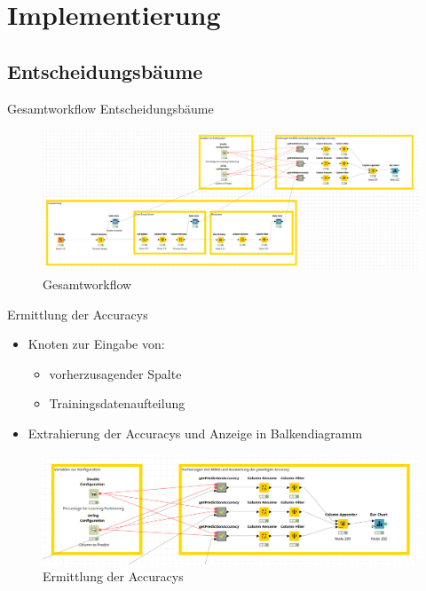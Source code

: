 \documentclass[
	handout,
  	aspectratio=169
]{beamer}
\begin{document}
	\section{Implementierung}	
	\frame{\sectionpage}
	
		\subsection{Entscheidungsbäume}
			\begin{frame}{Gesamtworkflow Entscheidungsbäume}
				\begin{center}					
					\begin{figure}[h]
						\includegraphics[scale=0.25]{../pictures/trees-workflow-gesamt.png}
						\caption{Gesamtworkflow}		
					\end{figure}	
				\end{center}	
			\end{frame}
			
			\begin{frame}{Ermittlung der Accuracys}
				\begin{itemize}
					\item Knoten zur Eingabe von:	
					\begin{itemize}
						\item vorherzusagender Spalte
						\item Trainingsdatenaufteilung
					\end{itemize}	
					\item Extrahierung der Accuracys und Anzeige in Balkendiagramm
				\end{itemize}
				\begin{center}					
					\begin{figure}[h]
						\includegraphics[scale=0.2]{../pictures/trees-workflow-gesamt-zoomed.png}
						\caption{Ermittlung der Accuracys}		
					\end{figure}	
				\end{center}	
			\end{frame}
			
\end{document}
